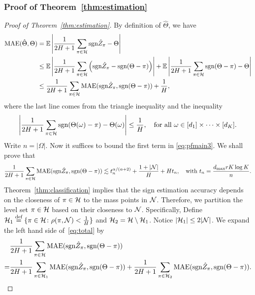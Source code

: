 \documentclass[11pt]{article}
\theoremstyle{plain}
\theoremstyle{definition}
\def\sign{\textup{sgn}}
\begin{document}
\subsubsection{Proof of Theorem~\ref{thm:estimation}}
\begin{proof}[Proof of Theorem~\ref{thm:estimation}]
By definition of $\hat\Theta$, we have
\begin{align}\label{eq:pfmain3}\nonumber
\text{MAE}(\hat\Theta,\Theta) &= \mathbb{E}\left|\frac{1}{2H+1}\sum_{\pi\in\tH}\sign\hat Z_\pi-\Theta\right|\\\nonumber
&\leq \mathbb{E}\left|\frac{1}{2H+1}\sum_{\pi\in\tH}\left(\sign\hat Z_\pi-\sign(\Theta-\pi)\right)\right|+\mathbb{E}\left|\frac{1}{2H+1}\sum_{\pi\in\tH}\sign(\Theta-\pi)-\Theta\right|\\&
\leq \frac{1}{2H+1}\sum_{\pi\in\tH}\text{MAE}(\sign\hat Z_\pi,\sign(\Theta-\pi))+\frac{1}{H},
\end{align}
where the last line comes  from the triangle inequality and the inequality
\begin{equation}
\left|\frac{1}{2H+1}\sum_{\pi\in\tH}\sign(\Theta(\omega)-\pi)-\Theta(\omega)\right|\leq \frac{1}{H},\quad\text{for all } \omega\in[d_1]\times\cdots\times[d_K] .
\end{equation}
Write $n=|\Omega|$. Now it suffices to bound  the first term in \eqref{eq:pfmain3}.  We shall prove that 
\begin{equation}\label{eq:total}
{1\over 2H+1}\sum_{\pi \in \tH} \textup{MAE}(\sign \hat Z_\pi, \sign (\Theta-\pi)) \lesssim  t_n^{\alpha/(\alpha+2)}+{1+|\tN|\over H}+ H t_n, \quad \text{with } t_n={d_{\max}rK\log K\over n}.
\end{equation}
Theorem~\ref{thm:classification} implies that the  sign estimation accuracy depends on the closeness of $\pi\in \mathcal{H}$ to the mass points in $\mathcal{N}$. Therefore, we partition the level set $\pi \in \mathcal{H}$ based on their closeness to $\mathcal{N}$. Specifically, Define $\mathcal{H}_1 \stackrel{\text{def}}{=}\{\pi\in\mathcal{H}\colon \rho(\pi,\mathcal{N})<\frac{1}{H}\}$ and $\mathcal{H}_2 = \mathcal{H}\setminus\mathcal{H}_1$.   Notice $|\mathcal{H}_1|\leq 2|\mathcal{N}|$.  We expand the left hand side of~\eqref{eq:total} by
\begin{align}\label{eq:twobounds}
&{1\over 2H+1}\sum_{\pi \in \tH} \textup{MAE}(\sign \hat Z_\pi, \sign (\Theta-\pi))\notag \\
=&{1\over 2H+1}\sum_{\pi \in\tH_1} \textup{MAE}(\sign \hat Z_\pi, \sign (\Theta-\pi))+{1\over 2H+1}\sum_{\pi \in  \tH_2} \textup{MAE}(\sign \hat Z_\pi, \sign (\Theta-\pi)).
\end{align}

\end{proof}
\end{document}
